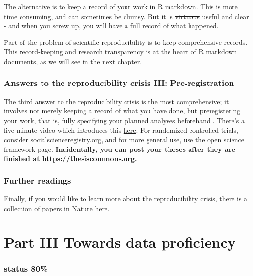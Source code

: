 \documentclass[
  openany]{book}
\begin{document}
The alternative is to keep a record of your work in R markdown. This is more time consuming, and can sometimes be clumsy. But it is \sout{virtuous} useful and clear - and when you screw up, you will have a full record of what happened.

Part of the problem of scientific reproducibility is to keep comprehensive records. This record-keeping and research transparency is at the heart of R markdown documents, as we will see in the next chapter.

\hypertarget{answers-to-the-reproducibility-crisis-iii-pre-registration}{%
\section{Answers to the reproducibility crisis III: Pre-registration}\label{answers-to-the-reproducibility-crisis-iii-pre-registration}}

The third answer to the reproducibility crisis is the most comprehensive; it involves not merely keeping a record of what you have done, but preregistering your work, that is, fully specifying your planned analyses beforehand \citep{miguel2014promoting}. There's a five-minute video which introduces this \href{https://www.futurelearn.com/courses/open-social-science-research/0/steps/31436}{here}. For randomized controlled trials, consider socialscienceregistry.org, and for more general use, use the open science framework page. \textbf{Incidentally, you can post your theses after they are finished at \url{https://thesiscommons.org}.}

\hypertarget{further-readings}{%
\section{Further readings}\label{further-readings}}

Finally, if you would like to learn more about the reproducibility crisis, there is a collection of papers in Nature \href{https://www.nature.com/collections/prbfkwmwvz/}{here}.

\hypertarget{part-part-iii-towards-data-proficiency}{%
\part{Part III Towards data proficiency}\label{part-part-iii-towards-data-proficiency}}

\hypertarget{status-80-2}{%
\section*{status 80\%}\label{status-80-2}}
\end{document}
